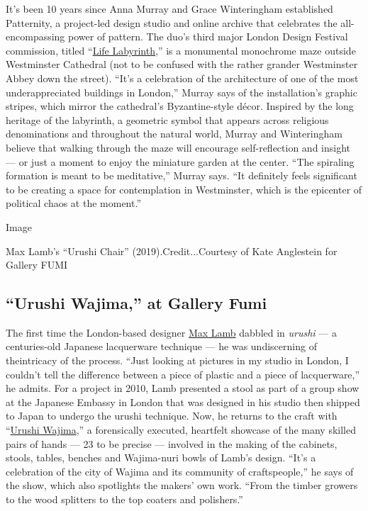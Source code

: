 It's been 10 years since Anna Murray and Grace Winteringham established
Patternity, a project-led design studio and online archive that
celebrates the all-encompassing power of pattern. The duo's third major
London Design Festival commission, titled
``\href{https://www.londondesignfestival.com/event/life-labyrinth}{Life
Labyrinth},'' is a monumental monochrome maze outside Westminster
Cathedral (not to be confused with the rather grander Westminster Abbey
down the street). ``It's a celebration of the architecture of one of the
most underappreciated buildings in London,'' Murray says of the
installation's graphic stripes, which mirror the cathedral's
Byzantine-style décor. Inspired by the long heritage of the labyrinth, a
geometric symbol that appears across religious denominations and
throughout the natural world, Murray and Winteringham believe that
walking through the maze will encourage self-reflection and insight ---
or just a moment to enjoy the miniature garden at the center. ``The
spiraling formation is meant to be meditative,'' Murray says. ``It
definitely feels significant to be creating a space for contemplation in
Westminster, which is the epicenter of political chaos at the moment.''

Image

Max Lamb's ``Urushi Chair'' (2019).Credit...Courtesy of Kate Anglestein
for Gallery FUMI

\hypertarget{urushi-wajima-at-gallery-fumi}{%
\subsection{``Urushi Wajima,'' at Gallery
Fumi}\label{urushi-wajima-at-gallery-fumi}}

The first time the London-based designer \href{http://maxlamb.org/}{Max
Lamb} dabbled in \emph{urushi} --- a centuries-old Japanese lacquerware
technique --- he was undiscerning of theintricacy of the process. ``Just
looking at pictures in my studio in London, I couldn't tell the
difference between a piece of plastic and a piece of lacquerware,'' he
admits. For a project in 2010, Lamb presented a stool as part of a group
show at the Japanese Embassy in London that was designed in his studio
then shipped to Japan to undergo the urushi technique. Now, he returns
to the craft with
``\href{https://www.londondesignfestival.com/event/urushi-wajima-max-lamb}{Urushi
Wajima},'' a forensically executed, heartfelt showcase of the many
skilled pairs of hands --- 23 to be precise --- involved in the making
of the cabinets, stools, tables, benches and Wajima-nuri bowls of Lamb's
design. ``It's a celebration of the city of Wajima and its community of
craftspeople,'' he says of the show, which also spotlights the makers'
own work. ``From the timber growers to the wood splitters to the top
coaters and polishers.''

